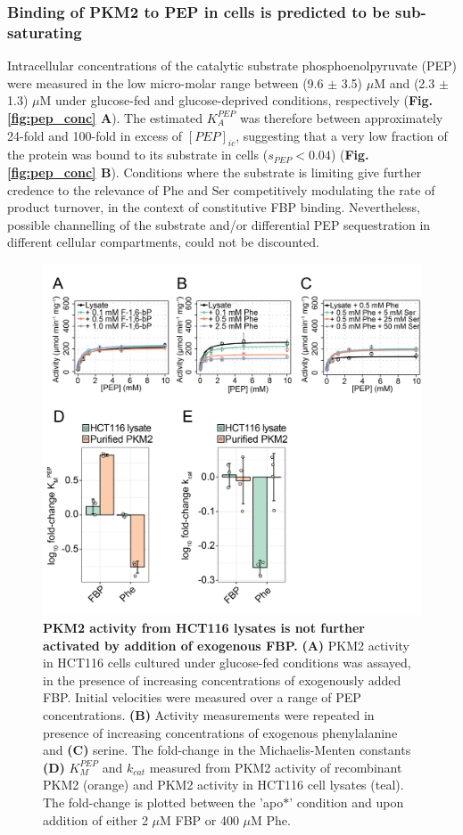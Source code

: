 \subsubsection{Binding of PKM2 to PEP in cells is predicted to be sub-saturating}
Intracellular concentrations of the catalytic substrate phosphoenolpyruvate (PEP) were measured in the low micro-molar range between (9.6 $\pm$ 3.5) $\mu$M and (2.3 $\pm$ 1.3) $\mu$M under glucose-fed and glucose-deprived conditions, respectively (\textbf{Fig. \ref{fig:pep_conc} A}). The estimated ${K_{A}^{PEP}}$ was therefore between approximately 24-fold and 100-fold in excess of $[PEP]_{ic}$, suggesting that a very low fraction of the protein was bound to its substrate in cells ($s_{PEP} < 0.04$) (\textbf{Fig. \ref{fig:pep_conc} B}). Conditions where the substrate is limiting give further credence to the relevance of Phe and Ser competitively modulating the rate of product turnover, in the context of constitutive FBP binding. Nevertheless, possible channelling of the substrate and/or differential PEP sequestration in different cellular compartments, could not be discounted.
%
%
%
%
\begin{figure}[!ht]
\includegraphics[scale=0.7]{ch4_fig11_lysate_activity.png}
\caption[PKM2 activity from HCT116 lysates is not further activated by addition of exogenous FBP.] {\textbf{PKM2 activity from HCT116 lysates is not further activated by addition of exogenous FBP.} \textbf{(A)} PKM2 activity in HCT116 cells cultured under glucose-fed conditions was assayed, in the presence of increasing concentrations of exogenously added FBP. Initial velocities were measured over a range of PEP concentrations. \textbf{(B)} Activity measurements were repeated in presence of increasing concentrations of exogenous phenylalanine and \textbf{(C)} serine. The fold-change in the Michaelis-Menten constants \textbf{(D)} $K_{M}^{PEP}$ and $k_{cat}$ measured from PKM2 activity of recombinant PKM2 (orange) and PKM2 activity in HCT116 cell lysates (teal). The fold-change is plotted between the 'apo$\ast$' condition and upon addition of either 2 $\mu$M FBP or 400 $\mu$M Phe.}
\label{fig:lysate_activity}
\end{figure}
